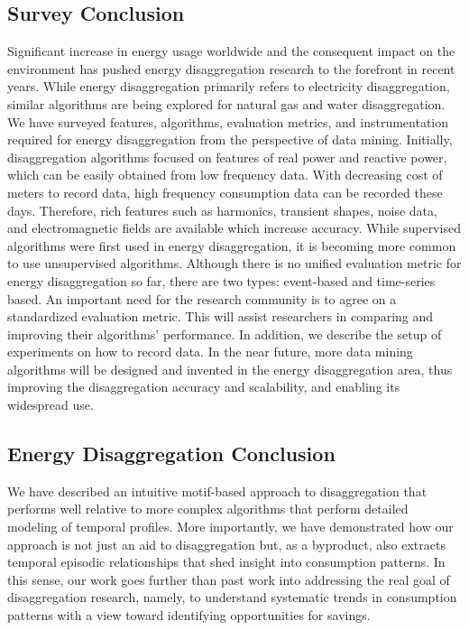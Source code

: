 \subsection{Survey Conclusion}
Significant increase in energy usage worldwide and the consequent impact
on the environment has pushed energy disaggregation research to the
forefront in recent years. 
While energy disaggregation primarily refers to electricity disaggregation,
similar algorithms are being explored for natural gas and water disaggregation. 
We have surveyed features, algorithms, evaluation metrics, and 
instrumentation required for energy disaggregation 
from the perspective of data mining. 
Initially, disaggregation algorithms focused on features
of real power and reactive power, which 
can be easily obtained from low frequency data.
With decreasing cost of meters to record data,
high frequency consumption data can be recorded these days. 
Therefore, rich features such as harmonics, transient shapes, 
noise data, and electromagnetic fields are available which increase accuracy. 
While supervised algorithms were first used in energy disaggregation, 
it is becoming more common to use unsupervised algorithms.
Although there is no unified evaluation metric for energy disaggregation 
so far, there are two types: 
event-based and time-series based. An important need for the research community is to 
agree on a standardized evaluation metric. This will assist researchers in
comparing and improving
their algorithms' performance.
In addition, we describe the setup of experiments on 
how to record data.  
In the near future, 
more data mining algorithms will be designed and invented in the 
energy disaggregation area, thus improving the disaggregation accuracy and
scalability, and enabling its widespread use. 

\subsection{Energy Disaggregation Conclusion}
We have described an intuitive motif-based approach to disaggregation that performs
well relative to more complex algorithms that perform detailed modeling of temporal
profiles.
More importantly,
we have demonstrated how our approach is not just an aid to disaggregation
but, as a byproduct, also extracts temporal episodic relationships that shed
insight into consumption patterns. In this sense, our work goes further
than past work into addressing the real goal of disaggregation research,
namely, to understand systematic trends in consumption patterns with a view
toward identifying opportunities for savings.

